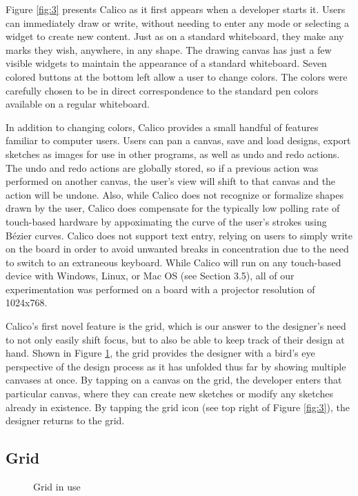 Figure \ref{fig:3} presents Calico as it first appears when a developer starts it. Users can immediately draw or write, without needing to enter any mode or selecting a widget to create new content. Just as on a standard whiteboard, they make any marks they wish, anywhere, in any shape. The drawing canvas has just a few visible widgets to maintain the appearance of a standard whiteboard. Seven colored buttons at the bottom left allow a user to change colors. The colors were carefully chosen to be in direct correspondence to the standard pen colors available on a regular whiteboard.

In addition to changing colors, Calico provides a small handful of features familiar to computer users. Users can pan a canvas, save and load designs, export sketches as images for use in other programs, as well as undo and redo actions. The undo and redo actions are globally stored, so if a previous action was performed on another canvas, the user's view will shift to that canvas and the action will be undone. Also, while Calico does not recognize or formalize shapes drawn by the user, Calico does compensate for the typically low polling rate of touch-based hardware by appoximating the curve of the user's strokes using B\'ezier curves. Calico does not support text entry, relying on users to simply write on the board in order to avoid unwanted breaks in concentration due to the need to switch to an extraneous keyboard. While Calico will run on any touch-based device with Windows, Linux, or Mac OS (see Section 3.5), all of our experimentation was performed on a board with a projector
 resolution of 1024x768.

Calico's first novel feature is the grid, which is our answer to the designer's need to not only easily shift focus, but to also be able to keep track of their design at hand. Shown in Figure \ref{fig:4}, the grid provides the designer with a bird's eye perspective of the design process as it has unfolded thus far by showing multiple canvases at once. By tapping on a canvas on the grid, the developer enters that particular canvas, where they can create new sketches or modify any sketches already in existence. By tapping the grid icon (see top right of Figure \ref{fig:3}), the designer returns to the grid. 

\subsection {Grid}
\label{calico:2}

\begin{figure}
 
\caption {Grid in use}
\label{fig:4}       %
\end{figure}
%

